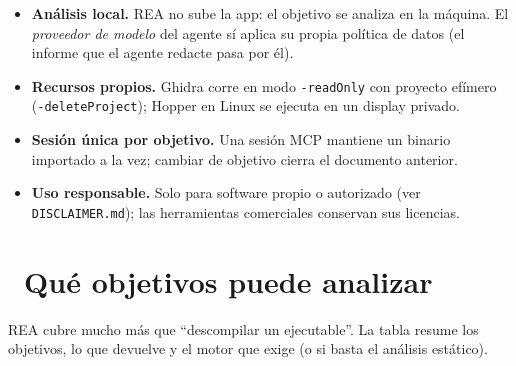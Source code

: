 \documentclass[11pt,a4paper]{article}
\newcommand{\iconotexto}[2]{\textcolor{cyanNeon}{\faIcon{#1}}~#2}
\begin{document}
\begin{tcolorbox}[tarjetaIcono, title={\faIcon{shield-alt}~Límites declarados por el propio proyecto}]
\begin{itemize}[leftmargin=1.2em]
  \item \textbf{Análisis local.} REA no sube la app: el objetivo se analiza en la máquina.
  El \emph{proveedor de modelo} del agente sí aplica su propia política de datos
  (el informe que el agente redacte pasa por él).
  \item \textbf{Recursos propios.} Ghidra corre en modo \texttt{-readOnly} con proyecto
  efímero (\texttt{-deleteProject}); Hopper en Linux se ejecuta en un display privado.
  \item \textbf{Sesión única por objetivo.} Una sesión MCP mantiene un binario importado a
  la vez; cambiar de objetivo cierra el documento anterior.
  \item \textbf{Uso responsable.} Solo para software propio o autorizado (ver
  \texttt{DISCLAIMER.md}); las herramientas comerciales conservan sus licencias.
\end{itemize}
\end{tcolorbox}

\section[Cobertura]{\iconotexto{layer-group}{Qué objetivos puede analizar}}

REA cubre mucho más que ``descompilar un ejecutable''. La tabla resume los objetivos, lo
que devuelve y el motor que exige (o si basta el análisis estático).
\end{document}
